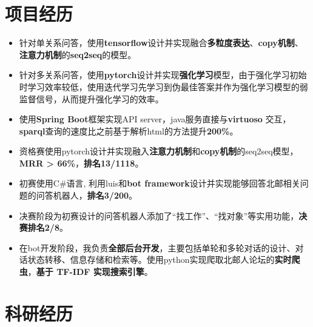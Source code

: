 \documentclass[11pt,a4paper]{moderncv}
\begin{document}
\section{项目经历}
{
\begin{itemize}
\item 针对单关系问答，使用\textbf{tensorflow}设计并实现融合\textbf{多粒度表达}、\textbf{copy机制}、\textbf{注意力机制}的\textbf{seq2seq}的模型。%
\item 针对多关系问答，使用\textbf{pytorch}设计并实现\textbf{强化学习}模型，由于强化学习初始时学习效率较低，使用迭代学习先学习到伪最佳答案并作为强化学习模型的弱监督信号，从而提升强化学习的效率。
\item 使用\textbf{Spring Boot}框架实现API server，java服务直接与\textbf{virtuoso} 交互，\textbf{sparql}查询的速度比之前基于解析html的方法提升\textbf{200\%}。
\end{itemize}}

{
\begin{itemize}
\item 资格赛使用pytorch设计并实现融入\textbf{注意力机制}和\textbf{copy机制}的seq2seq模型，\textbf{MRR > 66\%}，\textbf{排名13/1118}。
\item 初赛使用C\#语言, 利用luis和\textbf{bot framework}设计并实现能够回答北邮相关问题的问答机器人，\textbf{排名3/200}。
\item 决赛阶段为初赛设计的问答机器人添加了“找工作”、“找对象”等实用功能，\textbf{决赛排名2/8}。
\item 在bot开发阶段，我负责\textbf{全部后台开发}，主要包括单轮和多轮对话的设计、对话状态转移、信息存储和检索等。使用python实现爬取北邮人论坛的\textbf{实时爬虫}，\textbf{基于 TF-IDF 实现搜索引擎}。
\end{itemize}}

\section{科研经历}
\end{document}
